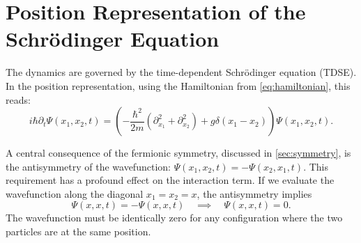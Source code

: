 \section{Position Representation of the Schrödinger Equation}

The dynamics are governed by the time-dependent Schrödinger equation (TDSE).
In the position representation, using the Hamiltonian from
\cref{eq:hamiltonian}, this reads:
\begin{equation} \label{eq:tdse}
	i\hbar\partial_t\Psi(x_1, x_2, t) = \left(
		-\frac{\hbar^2}{2m}(\partial_{x_1}^2 + \partial_{x_2}^2) + g\delta(x_1 - x_2)
	\right) \Psi(x_1, x_2, t).
\end{equation}

A central consequence of the fermionic symmetry, discussed in
\cref{sec:symmetry}, is the antisymmetry of the wavefunction:
$\Psi(x_1, x_2, t) = -\Psi(x_2, x_1, t)$.
This requirement has a profound effect on the interaction term.
If we evaluate the wavefunction along the diagonal $x_1 = x_2 = x$,
the antisymmetry implies
\begin{equation}
	\Psi(x, x, t) = -\Psi(x, x, t) \quad \implies \quad \Psi(x, x, t) = 0.
\end{equation}
The wavefunction must be identically zero for any configuration where
the two particles are at the same position.


